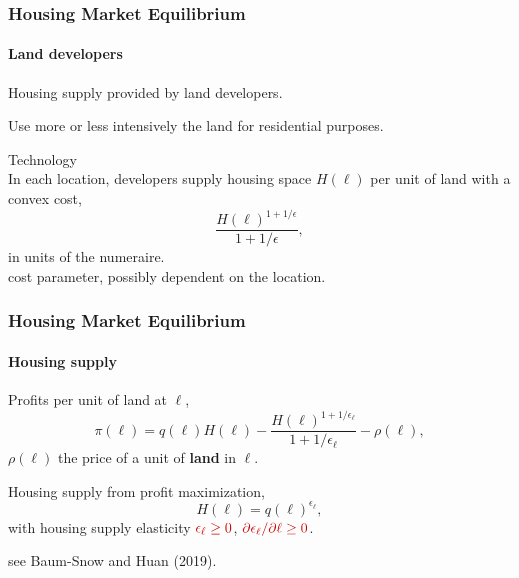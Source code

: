 \documentclass[aspectratio=169]{beamer}
\begin{document}



\begin{v75mins}
\begin{frame}[label=landdevelopers]
\frametitle{Housing Market Equilibrium}
\framesubtitle{Land developers}
\bi
\item Housing supply provided by land developers.
\item Use more or less intensively the land for residential purposes.
\item Technology\\
\medskip
In each location, developers supply housing space $H(\ell)$ per unit of land with a convex cost,
\begin{equation*}
\frac{H(\ell)^{1+1/\epsilon}}{1+1/\epsilon},
\end{equation*}
in units of the numeraire.\\
 \re{$\epsilon=$} cost parameter, possibly dependent on the location.
\ei
\end{frame}

\begin{frame}
\frametitle{Housing Market Equilibrium}
\framesubtitle{Housing supply}
\bi
\item Profits per unit of land at $\ell$,
\begin{equation*}
\pi(\ell)=q(\ell)H(\ell)-\frac{H(\ell)^{1+1/\epsilon_{\ell}}}{ 1+1/\epsilon_{\ell} }- \rho(\ell),
\end{equation*}
$\rho(\ell)$ the price of a unit of \textbf{land} in $\ell$.
\item Housing supply from profit maximization,
\begin{equation*}
H(\ell)=q(\ell) ^{\epsilon_{\ell}},
\end{equation*}
with housing supply elasticity  $\re{\epsilon_{\ell}\geq 0}$, $\re{\partial\epsilon_{\ell}/\partial \ell \geq 0}$.

see Baum-Snow and Huan (2019).  %
\ei
\end{frame}


\end{v75mins}
\end{document}
